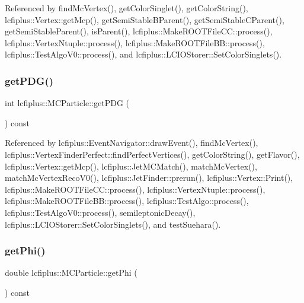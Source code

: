 Referenced by find\+Mc\+Vertex(), get\+Color\+Singlet(), get\+Color\+String(), lcfiplus\+::\+Vertex\+::get\+Mcp(), get\+Semi\+Stable\+B\+Parent(), get\+Semi\+Stable\+C\+Parent(), get\+Semi\+Stable\+Parent(), is\+Parent(), lcfiplus\+::\+Make\+R\+O\+O\+T\+File\+C\+C\+::process(), lcfiplus\+::\+Vertex\+Ntuple\+::process(), lcfiplus\+::\+Make\+R\+O\+O\+T\+File\+B\+B\+::process(), lcfiplus\+::\+Test\+Algo\+V0\+::process(), and lcfiplus\+::\+L\+C\+I\+O\+Storer\+::\+Set\+Color\+Singlets().

\mbox{\label{classlcfiplus_1_1MCParticle_a16a4a09cd46b43fef385194072b92ff7}} 
\subsubsection{get\+P\+D\+G()}
{\footnotesize\ttfamily int lcfiplus\+::\+M\+C\+Particle\+::get\+P\+DG (\begin{DoxyParamCaption}{ }\end{DoxyParamCaption}) const\hspace{0.3cm}{\ttfamily [inline]}}



Referenced by lcfiplus\+::\+Event\+Navigator\+::draw\+Event(), find\+Mc\+Vertex(), lcfiplus\+::\+Vertex\+Finder\+Perfect\+::find\+Perfect\+Vertices(), get\+Color\+String(), get\+Flavor(), lcfiplus\+::\+Vertex\+::get\+Mcp(), lcfiplus\+::\+Jet\+M\+C\+Match(), match\+Mc\+Vertex(), match\+Mc\+Vertex\+Reco\+V0(), lcfiplus\+::\+Jet\+Finder\+::prerun(), lcfiplus\+::\+Vertex\+::\+Print(), lcfiplus\+::\+Make\+R\+O\+O\+T\+File\+C\+C\+::process(), lcfiplus\+::\+Vertex\+Ntuple\+::process(), lcfiplus\+::\+Make\+R\+O\+O\+T\+File\+B\+B\+::process(), lcfiplus\+::\+Test\+Algo\+::process(), lcfiplus\+::\+Test\+Algo\+V0\+::process(), semileptonic\+Decay(), lcfiplus\+::\+L\+C\+I\+O\+Storer\+::\+Set\+Color\+Singlets(), and test\+Suehara().

\mbox{\label{classlcfiplus_1_1MCParticle_a98362c21760502f3bf6f39d2b42957c1}} 
\subsubsection{get\+Phi()}
{\footnotesize\ttfamily double lcfiplus\+::\+M\+C\+Particle\+::get\+Phi (\begin{DoxyParamCaption}{ }\end{DoxyParamCaption}) const}



